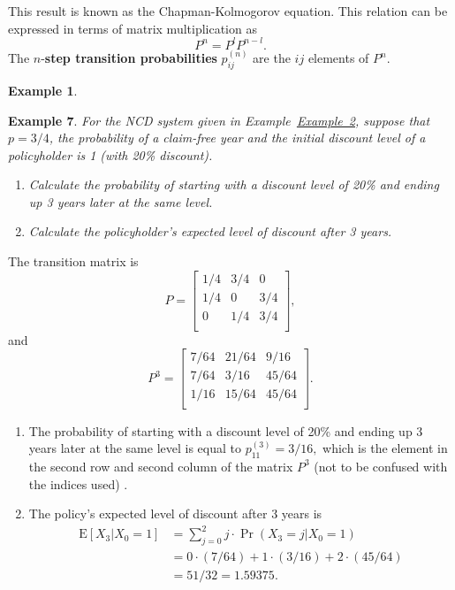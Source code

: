 \documentclass[
]{book}
\theoremstyle{definition}
\theoremstyle{definition}
\newtheorem{example}{Example}[chapter]
\theoremstyle{definition}
\theoremstyle{definition}
\theoremstyle{remark}
\begin{document}
This result is known as the Chapman-Kolmogorov equation. This relation
can be expressed in terms of matrix multiplication as
\[P^n  = P^l P^{n-l}.\] The \(n\)-\textbf{step transition probabilities}
\(p^{(n)}_{ij}\) are the \(ij\) elements of \(P^n\).

\begin{example}
\protect\hypertarget{exm:unlabeled-div-17}{}\label{exm:unlabeled-div-17}

\textbf{Example 7}. \emph{For the NCD system given in
Example~\protect\hyperlink{NCD}{Example~2}, suppose
that \(p = 3/4\), the probability of a claim-free year and the initial
discount level of a policyholder is 1 (with 20\% discount).}

\begin{enumerate}
\def\labelenumi{\arabic{enumi}.}
\item
  \emph{Calculate the probability of starting with a discount level of 20\%
  and ending up 3 years later at the same level.}
\item
  \emph{Calculate the policyholder's expected level of discount after 3
  years.}
\end{enumerate}

\end{example}

The transition matrix is \[P = \begin{bmatrix}
    1/4 & 3/4 & 0    \\
    1/4 & 0 & 3/4   \\
    0 & 1/4 & 3/4    \\
\end{bmatrix},\] and \[P^3 = \begin{bmatrix}
    7/64 & 21/64 & 9/16    \\
    7/64 & 3/16 & 45/64   \\
    1/16 & 15/64 & 45/64    \\
\end{bmatrix}.\]

\begin{enumerate}
\def\labelenumi{\arabic{enumi}.}
\item
  The probability of starting with a discount level of 20\% and ending
  up 3 years later at the same level is equal to
  \(p_{11}^{(3)} = 3/16,\) which is the element in the second row and
  second column of the matrix \(P^3\) (not to be confused with the
  indices used) .
\item
  The policy's expected level of discount after 3 years is
  \[\begin{aligned}
  \mathrm{E}[X_3 | X_0 = 1] &= \sum_{j=0}^{2} j \cdot  \Pr(X_3 = j | X_0 = 1) \\
  &= 0 \cdot (7/64) + 1 \cdot (3/16) + 2 \cdot (45/64)   \\
  &= 51/32 = 1.59375.\end{aligned}\]
\end{enumerate}
\end{document}
